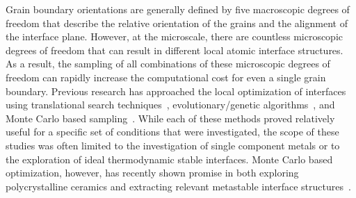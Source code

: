 \documentclass[aip,reprint,longbibliography,amsmath,amssymb,twocolumn,superscriptaddress]{revtex4-1}
\begin{document}
Grain boundary orientations are generally defined by five macroscopic degrees of freedom that describe the relative orientation of the grains and the alignment of the interface plane. 
%
However, at the microscale, there are countless microscopic degrees of freedom that can result in different local atomic interface structures. 
%
As a result, the sampling of all combinations of these microscopic degrees of freedom can rapidly increase the computational cost for even a single grain boundary. 
%
Previous research has approached the local optimization of interfaces using translational search techniques~\cite{Olmsted2009}, evolutionary/genetic algorithms~\cite{Zhu2018}, and Monte Carlo based sampling~\cite{Banadaki2018}.
%
While each of these methods proved relatively useful for a specific set of conditions that were investigated, the scope of these studies was often limited to the investigation of single component metals or to the exploration of ideal thermodynamic stable interfaces. 
%
Monte Carlo based optimization, however, has recently shown promise in both exploring polycrystalline ceramics and extracting relevant metastable interface structures~\cite{Guziewski2019}. 

\end{document}
